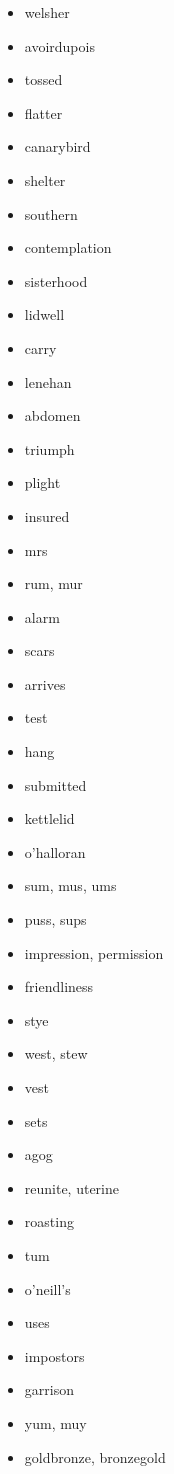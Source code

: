 \documentclass{article}
\begin{document}
\begin{itemize}
    \item welsher
    \item avoirdupois
    \item tossed
    \item flatter
    \item canarybird
    \item shelter
    \item southern
    \item contemplation
    \item sisterhood
    \item lidwell
    \item carry
    \item lenehan
    \item abdomen
    \item triumph
    \item plight
    \item insured
    \item mrs
    \item rum, mur
    \item alarm
    \item scars
    \item arrives
    \item test
    \item hang
    \item submitted
    \item kettlelid
    \item o'halloran
    \item sum, mus, ums
    \item puss, sups
    \item impression, permission
    \item friendliness
    \item stye
    \item west, stew
    \item vest
    \item sets
    \item agog
    \item reunite, uterine
    \item roasting
    \item tum
    \item o'neill's
    \item uses
    \item impostors
    \item garrison
    \item yum, muy
    \item goldbronze, bronzegold

\end{itemize}
\end{document}
